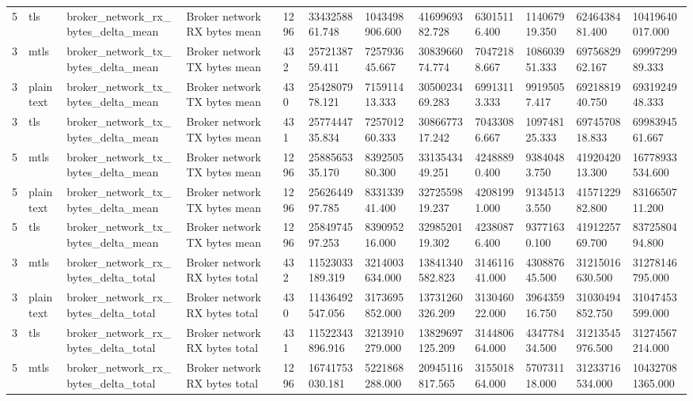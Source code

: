 \begin{longtable}{llllllllllll}
5 & tls & broker\_network\_rx\_bytes\_delta\_mean & Broker network RX bytes mean & 1296 & 3343258861.748 & 1043498906.600 & 4169969382.728 & 63015116.400 & 114067919.350 & 6246438481.400 & 10419640017.000 \\
3 & mtls & broker\_network\_tx\_bytes\_delta\_mean & Broker network TX bytes mean & 432 & 2572138759.411 & 725793645.667 & 3083966074.774 & 70472188.667 & 108603951.333 & 6975682962.167 & 6999729989.333 \\
3 & plaintext & broker\_network\_tx\_bytes\_delta\_mean & Broker network TX bytes mean & 430 & 2542807978.121 & 715911413.333 & 3050023469.283 & 69913113.333 & 99195057.417 & 6921881940.750 & 6931924948.333 \\
3 & tls & broker\_network\_tx\_bytes\_delta\_mean & Broker network TX bytes mean & 431 & 2577444735.834 & 725701260.333 & 3086677317.242 & 70433086.667 & 109748125.333 & 6974570818.833 & 6998394561.667 \\
5 & mtls & broker\_network\_tx\_bytes\_delta\_mean & Broker network TX bytes mean & 1296 & 2588565335.170 & 839250580.300 & 3313543449.251 & 42488890.400 & 93840483.750 & 4192042013.300 & 16778933534.600 \\
5 & plaintext & broker\_network\_tx\_bytes\_delta\_mean & Broker network TX bytes mean & 1296 & 2562644997.785 & 833133941.400 & 3272559819.237 & 42081991.000 & 91345133.550 & 4157122982.800 & 8316650711.200 \\
5 & tls & broker\_network\_tx\_bytes\_delta\_mean & Broker network TX bytes mean & 1296 & 2584974597.253 & 839095216.000 & 3298520119.302 & 42380876.400 & 93771630.100 & 4191225769.700 & 8372580494.800 \\
3 & mtls & broker\_network\_rx\_bytes\_delta\_total & Broker network RX bytes total & 432 & 11523033189.319 & 3214003634.000 & 13841340582.823 & 314611641.000 & 430887645.500 & 31215016630.500 & 31278146795.000 \\
3 & plaintext & broker\_network\_rx\_bytes\_delta\_total & Broker network RX bytes total & 430 & 11436492547.056 & 3173695852.000 & 13731260326.209 & 313046022.000 & 396435916.750 & 31030494852.750 & 31047453599.000 \\
3 & tls & broker\_network\_rx\_bytes\_delta\_total & Broker network RX bytes total & 431 & 11522343896.916 & 3213910279.000 & 13829697125.209 & 314480664.000 & 434778434.500 & 31213545976.500 & 31274567214.000 \\
5 & mtls & broker\_network\_rx\_bytes\_delta\_total & Broker network RX bytes total & 1296 & 16741753030.181 & 5221868288.000 & 20945116817.565 & 315501864.000 & 570731118.000 & 31233716534.000 & 104327081365.000 \\

\end{longtable}
